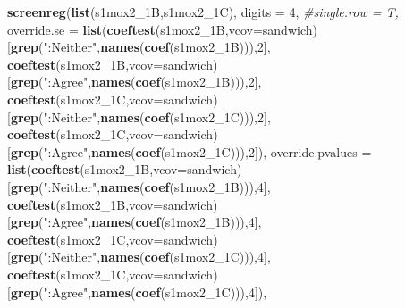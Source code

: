 \documentclass[
]{article}
\newenvironment{Shaded}{\begin{snugshade}}{\end{snugshade}}
\newcommand{\CommentTok}[1]{\textcolor[rgb]{0.56,0.35,0.01}{\textit{#1}}}
\newcommand{\DataTypeTok}[1]{\textcolor[rgb]{0.13,0.29,0.53}{#1}}
\newcommand{\DecValTok}[1]{\textcolor[rgb]{0.00,0.00,0.81}{#1}}
\newcommand{\KeywordTok}[1]{\textcolor[rgb]{0.13,0.29,0.53}{\textbf{#1}}}
\newcommand{\NormalTok}[1]{#1}
\newcommand{\StringTok}[1]{\textcolor[rgb]{0.31,0.60,0.02}{#1}}
\begin{document}
\begin{Shaded}
\begin{Highlighting}[]
\KeywordTok{screenreg}\NormalTok{(}\KeywordTok{list}\NormalTok{(s1mox2_1B,s1mox2_1C), }\DataTypeTok{digits =} \DecValTok{4}\NormalTok{, }\CommentTok{#single.row = T,}
          \DataTypeTok{override.se =} \KeywordTok{list}\NormalTok{(}\KeywordTok{coeftest}\NormalTok{(s1mox2_1B,}\DataTypeTok{vcov=}\NormalTok{sandwich)[}\KeywordTok{grep}\NormalTok{(}\StringTok{":Neither"}\NormalTok{,}\KeywordTok{names}\NormalTok{(}\KeywordTok{coef}\NormalTok{(s1mox2_1B))),}\DecValTok{2}\NormalTok{],}
                             \KeywordTok{coeftest}\NormalTok{(s1mox2_1B,}\DataTypeTok{vcov=}\NormalTok{sandwich)[}\KeywordTok{grep}\NormalTok{(}\StringTok{":Agree"}\NormalTok{,}\KeywordTok{names}\NormalTok{(}\KeywordTok{coef}\NormalTok{(s1mox2_1B))),}\DecValTok{2}\NormalTok{],}
                             \KeywordTok{coeftest}\NormalTok{(s1mox2_1C,}\DataTypeTok{vcov=}\NormalTok{sandwich)[}\KeywordTok{grep}\NormalTok{(}\StringTok{":Neither"}\NormalTok{,}\KeywordTok{names}\NormalTok{(}\KeywordTok{coef}\NormalTok{(s1mox2_1C))),}\DecValTok{2}\NormalTok{],}
                             \KeywordTok{coeftest}\NormalTok{(s1mox2_1C,}\DataTypeTok{vcov=}\NormalTok{sandwich)[}\KeywordTok{grep}\NormalTok{(}\StringTok{":Agree"}\NormalTok{,}\KeywordTok{names}\NormalTok{(}\KeywordTok{coef}\NormalTok{(s1mox2_1C))),}\DecValTok{2}\NormalTok{]),}
          \DataTypeTok{override.pvalues =} \KeywordTok{list}\NormalTok{(}\KeywordTok{coeftest}\NormalTok{(s1mox2_1B,}\DataTypeTok{vcov=}\NormalTok{sandwich)[}\KeywordTok{grep}\NormalTok{(}\StringTok{":Neither"}\NormalTok{,}\KeywordTok{names}\NormalTok{(}\KeywordTok{coef}\NormalTok{(s1mox2_1B))),}\DecValTok{4}\NormalTok{],}
                                  \KeywordTok{coeftest}\NormalTok{(s1mox2_1B,}\DataTypeTok{vcov=}\NormalTok{sandwich)[}\KeywordTok{grep}\NormalTok{(}\StringTok{":Agree"}\NormalTok{,}\KeywordTok{names}\NormalTok{(}\KeywordTok{coef}\NormalTok{(s1mox2_1B))),}\DecValTok{4}\NormalTok{],}
                                  \KeywordTok{coeftest}\NormalTok{(s1mox2_1C,}\DataTypeTok{vcov=}\NormalTok{sandwich)[}\KeywordTok{grep}\NormalTok{(}\StringTok{":Neither"}\NormalTok{,}\KeywordTok{names}\NormalTok{(}\KeywordTok{coef}\NormalTok{(s1mox2_1C))),}\DecValTok{4}\NormalTok{],}
                                  \KeywordTok{coeftest}\NormalTok{(s1mox2_1C,}\DataTypeTok{vcov=}\NormalTok{sandwich)[}\KeywordTok{grep}\NormalTok{(}\StringTok{":Agree"}\NormalTok{,}\KeywordTok{names}\NormalTok{(}\KeywordTok{coef}\NormalTok{(s1mox2_1C))),}\DecValTok{4}\NormalTok{]),}

\end{Highlighting}
\end{Shaded}
\end{document}
